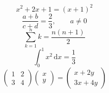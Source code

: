 \documentclass[14pt]{extarticle}
\begin{document}
\[
x^2 + 2x + 1 = (x+1)^2
\]
\vspace{10mm}
\[
\frac{a+b}{c+d}=\frac{2}{3},\qquad a\ne 0
\]
\vspace{10mm}
\[
\sum_{k=1}^{n} k = \frac{n(n+1)}{2}
\]
\vspace{10mm}
\[
\int_0^1 x^2\,\mathrm{d}x=\frac{1}{3}
\]
\vspace{10mm}
\[
\begin{pmatrix}1&2\\3&4\end{pmatrix}
\begin{pmatrix}x\\y\end{pmatrix}
=\begin{pmatrix}x+2y\\3x+4y\end{pmatrix}
\]
\end{document}
